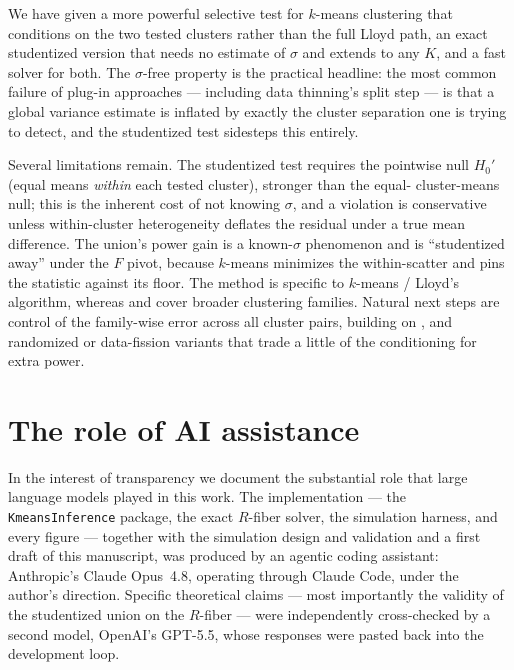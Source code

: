 \documentclass[11pt]{article}
\begin{document}
We have given a more powerful selective test for $k$-means clustering that
conditions on the two tested clusters rather than the full Lloyd path, an exact
studentized version that needs no estimate of $\sigma$ and extends
\citet{yun2023unknownvar} to any $K$, and a fast solver for both. The
$\sigma$-free property is the practical headline: the most common failure of
plug-in approaches --- including data thinning's split step --- is that a global
variance estimate is inflated by exactly the cluster separation one is trying to
detect, and the studentized test sidesteps this entirely.

Several limitations remain. The studentized test requires the pointwise null
$H_0'$ (equal means \emph{within} each tested cluster), stronger than the equal-
cluster-means null; this is the inherent cost of not knowing $\sigma$, and a
violation is conservative unless within-cluster heterogeneity deflates the
residual under a true mean difference. The union's power gain is a known-$\sigma$
phenomenon and is ``studentized away'' under the $F$ pivot, because $k$-means
minimizes the within-scatter and pins the statistic against its floor. The method
is specific to $k$-means / Lloyd's algorithm, whereas \citet{yun2023unknownvar}
and \citet{gao2024hierarchical} cover broader clustering families. Natural next
steps are control of the family-wise error across all cluster pairs, building on
\citet{yun2024multiplepairs}, and randomized or data-fission variants that trade
a little of the conditioning for extra power.

\section{The role of AI assistance}
\label{sec:ai}
In the interest of transparency we document the substantial role that large
language models played in this work. The implementation --- the
\texttt{KmeansInference} package, the exact $R$-fiber solver, the simulation
harness, and every figure --- together with the simulation design and validation
and a first draft of this manuscript, was produced by an agentic coding assistant:
Anthropic's Claude Opus~4.8, operating through Claude Code, under the author's
direction. Specific theoretical claims --- most importantly the validity of the
studentized union on the $R$-fiber --- were independently cross-checked by a
second model, OpenAI's GPT-5.5, whose responses were pasted back into the
development loop.
\end{document}
